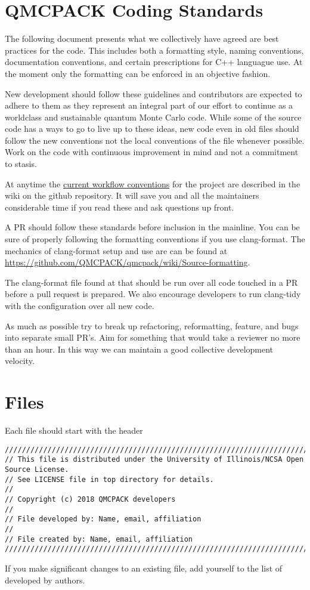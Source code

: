 \section{QMCPACK Coding Standards}

The following document presents what we collectively have agreed are best practices for the code. This includes both a formatting style, naming conventions, documentation conventions, and certain prescriptions for C++ languague use. At the moment only the formatting can be enforced in an objective fashion.

New development should follow these guidelines and contributors are expected to adhere to them as they represent an integral part of our effort to continue \qmcpack as a worldclass and sustainable quantum Monte Carlo code. While some of the source code has a ways to go to live up to these ideas, new code even in old files should follow the new conventions not the local conventions of the file whenever possible. Work on the code with continuous improvement in mind and not a commitment to stasis.

At anytime the \href{https://github.com/QMCPACK/qmcpack/wiki/Development-workflow}{current workflow conventions} for the project are described in the wiki on the github repository. It will save you and all the maintainers considerable time if you read these and ask questions up front.

A PR should follow these standards before inclusion in the mainline. You can be sure of properly following the formatting conventions if you use clang-format.  The mechanics of clang-format setup and use are can be found at \url{https://github.com/QMCPACK/qmcpack/wiki/Source-formatting}.

The clang-format file found at  that should be run over all code touched in a PR before a pull request is prepared. We also encourage developers to run clang-tidy with the  configuration over all new code.

As much as possible try to break up refactoring, reformatting, feature, and bugs into separate small PR's. Aim for something that would take a reviewer no more than an hour. In this way we can maintain a good collective development velocity.

\section{Files}
Each file should start with the header
\lstset{language=C++,style=C++}
\begin{lstlisting}
//////////////////////////////////////////////////////////////////////////////////////
// This file is distributed under the University of Illinois/NCSA Open Source License.
// See LICENSE file in top directory for details.
//
// Copyright (c) 2018 QMCPACK developers
//
// File developed by: Name, email, affiliation
//
// File created by: Name, email, affiliation
//////////////////////////////////////////////////////////////////////////////////////
\end{lstlisting}
If you make significant changes to an existing file, add yourself to the list of developed by authors.

